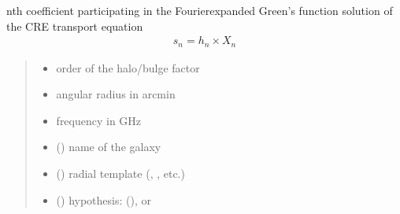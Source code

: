 \documentclass[letterpaper,10pt,english]{sphinxmanual}
\begin{document}
\begin{fulllineitems}
\label{\detokenize{diffsph:diffsph.pyflux.coeff}}
\pysigstartsignatures
{}
\pysigstopsignatures
\sphinxAtStartPar
n\sphinxhyphen{}th coefficient participating in the Fourier\sphinxhyphen{}expanded Green’s function solution of the CRE transport equation
\begin{equation*}
\begin{split}s_n = h_n\times X_n\end{split}
\end{equation*}\begin{quote}\begin{description}
\begin{itemize}
\item {} 
\sphinxAtStartPar
{} \textendash{} order of the halo/bulge factor

\item {} 
\sphinxAtStartPar
{} \textendash{} angular radius in arcmin

\item {} 
\sphinxAtStartPar
{} \textendash{} frequency in GHz

\item {} 
\sphinxAtStartPar
{} () \textendash{} name of the galaxy

\item {} 
\sphinxAtStartPar
{} () \textendash{} radial template (, , etc.)

\item {} 
\sphinxAtStartPar
{} () \textendash{} hypothesis:  (),  or 


\end{itemize}
\end{description}
\end{quote}
\end{fulllineitems}
\end{document}
